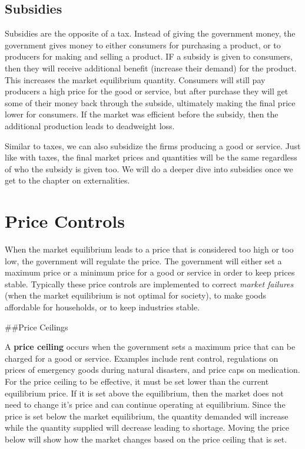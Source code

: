 \documentclass[
]{book}
\begin{document}
\section{Subsidies}\label{subsidies}

Subsidies are the opposite of a tax. Instead of giving the government money, the government gives money to either consumers for purchasing a product, or to producers for making and selling a product. IF a subsidy is given to consumers, then they will receive additional benefit (increase their demand) for the product. This increases the market equilibrium quantity. Consumers will still pay producers a high price for the good or service, but after purchase they will get some of their money back through the subside, ultimately making the final price lower for consumers. If the market was efficient before the subsidy, then the additional production leads to deadweight loss.

Similar to taxes, we can also subsidize the firms producing a good or service. Just like with taxes, the final market prices and quantities will be the same regardless of who the subsidy is given too. We will do a deeper dive into subsidies once we get to the chapter on externalities.

\chapter{Price Controls}\label{price-controls}

When the market equilibrium leads to a price that is considered too high or too low, the government will regulate the price. The government will either set a maximum price or a minimum price for a good or service in order to keep prices stable. Typically these price controls are implemented to correct \emph{market failures} (when the market equilibrium is not optimal for society), to make goods affordable for households, or to keep industries stable.

\#\#Price Ceilings

A \textbf{price ceiling} occurs when the government sets a maximum price that can be charged for a good or service. Examples include rent control, regulations on prices of emergency goods during natural disasters, and price caps on medication. For the price ceiling to be effective, it must be set lower than the current equilibrium price. If it is set above the equilibrium, then the market does not need to change it's price and can continue operating at equilibrium.
Since the price is set below the market equilibrium, the quantity demanded will increase while the quantity supplied will decrease leading to shortage. Moving the price below will show how the market changes based on the price ceiling that is set.
\end{document}
